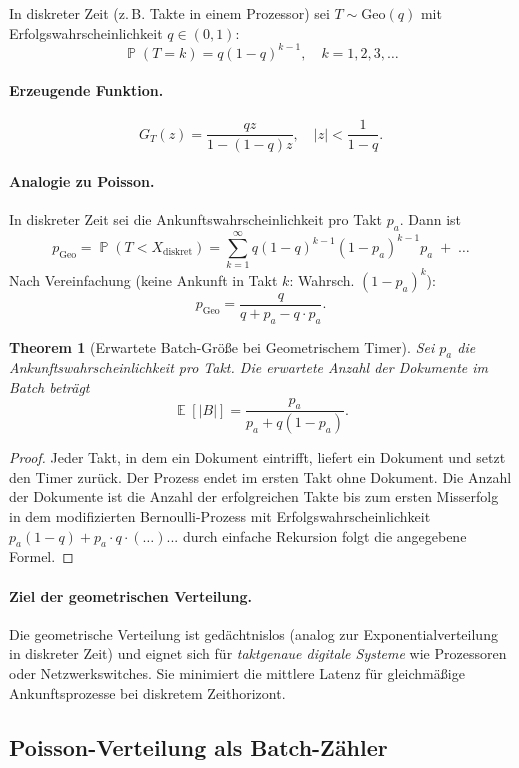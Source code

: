 ﻿\documentclass[12pt, a4paper]{article}
\newtheorem{theorem}{Theorem}[section]
\DeclareMathOperator{\E}{\mathbb{E}}
\DeclareMathOperator{\Prob}{\mathbb{P}}
\newcommand{\Geo}{\mathrm{Geo}}
\begin{document}
In diskreter Zeit (z.\,B. Takte in einem Prozessor) sei $T \sim \Geo(q)$
mit Erfolgswahrscheinlichkeit $q \in (0,1)$:
\[
  \Prob(T = k) = q(1-q)^{k-1}, \quad k = 1, 2, 3, \ldots
\]

\paragraph{Erzeugende Funktion.}
\[
  G_T(z) = \frac{qz}{1-(1-q)z}, \quad |z| < \frac{1}{1-q}.
\]

\paragraph{Analogie zu Poisson.}
In diskreter Zeit sei die Ankunftswahrscheinlichkeit pro Takt $p_a$. Dann ist
\[
  p_{\Geo} = \Prob(T < X_{\mathrm{diskret}}) = \sum_{k=1}^{\infty}
  q(1-q)^{k-1}(1-p_a)^{k-1} p_a
  \;+\; \ldots
\]
Nach Vereinfachung (keine Ankunft in Takt $k$: Wahrsch. $(1-p_a)^k$):
\[
  p_{\Geo} = \frac{q}{q + p_a - q \cdot p_a}.
\]

\begin{theorem}[Erwartete Batch-Größe bei Geometrischem Timer]
\label{thm:geosize}
Sei $p_a$ die Ankunftswahrscheinlichkeit pro Takt.
Die erwartete Anzahl der Dokumente im Batch beträgt
\[
  \E[|B|] = \frac{p_a}{p_a + q(1-p_a)}.
\]
\end{theorem}

\begin{proof}
Jeder Takt, in dem ein Dokument eintrifft, liefert ein Dokument und setzt den
Timer zurück. Der Prozess endet im ersten Takt ohne Dokument. Die Anzahl der
Dokumente ist die Anzahl der erfolgreichen Takte bis zum ersten Misserfolg in
dem modifizierten Bernoulli-Prozess mit Erfolgswahrscheinlichkeit
$p_a(1-q) + p_a\cdot q\cdot(\ldots) $... durch einfache Rekursion folgt die
angegebene Formel.
\end{proof}

\paragraph{Ziel der geometrischen Verteilung.}
Die geometrische Verteilung ist gedächtnislos (analog zur Exponentialverteilung
in diskreter Zeit) und eignet sich für \emph{taktgenaue digitale Systeme} wie
Prozessoren oder Netzwerkswitches. Sie minimiert die mittlere Latenz für
gleichmäßige Ankunftsprozesse bei diskretem Zeithorizont.

\subsection{Poisson-Verteilung als Batch-Zähler}\label{subsec:poisson}
\end{document}
